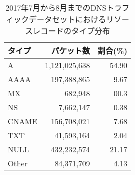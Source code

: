 \begin{table}[h]
 \centering
  \begin{tabular}{lrr}
    \toprule
    \textbf{タイプ} & \textbf{パケット数} & \textbf{割合(\%)}\\
    \midrule
    A & 1,121,025,638 & 54.90\\
    AAAA & 197,388,865 & 9.67\\
    MX & 682,948 & 00.3\\
    NS & 7,662,147 & 0.38 \\
    CNAME & 156,708,021 & 7.68 \\
    TXT & 41,593,164 & 2.04 \\
    NULL & 432,232,574 & 21.17 \\
    Other & 84,371,709 & 4.13 \\
    \bottomrule
  \end{tabular}
 \caption{2017年7月から8月までのDNSトラフィックデータセットにおけるリソースレコードのタイプ分布}
 \label{tab:infil-rtype}
\end{table}
